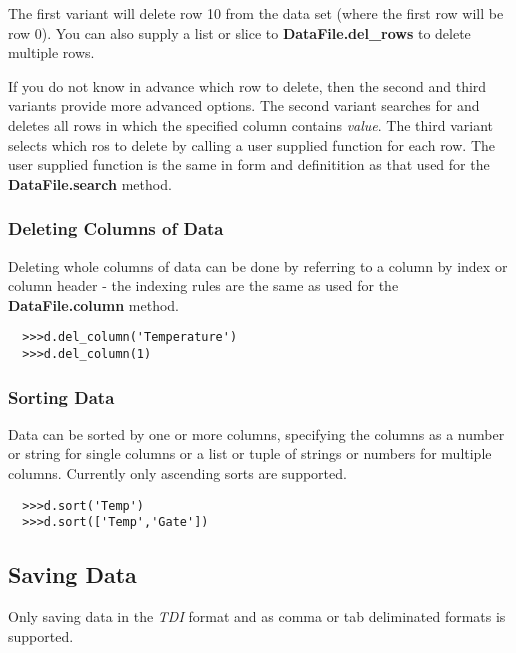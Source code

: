 \documentclass[a4paper,11pt]{scrartcl}
\begin{document}
The first variant will delete row 10 from the data set (where the first row will
be row 0). You can also supply a list or slice to \textbf{DataFile.del\_rows} to
delete multiple rows.

If you do not know in advance which row to delete, then the second and third
variants provide more advanced options. The second variant searches for and
deletes all rows in which the specified column contains \textit{value}. The
third variant selects which ros to delete by calling a user supplied function
for each row. The user supplied function is the same in form and definitition as
that used for the \textbf{DataFile.search} method.

\subsubsection{Deleting Columns of Data}

Deleting whole columns of data can be done by referring to a column by index or
column header - the indexing rules are the same as used for the
\textbf{DataFile.column} method.

\begin{verbatim}
  >>>d.del_column('Temperature')
  >>>d.del_column(1)
\end{verbatim}

\subsubsection{Sorting Data}

Data can be sorted by one or more columns, specifying the columns as a number or
string for single columns or a list or tuple of strings or numbers for multiple
columns. Currently only ascending sorts are supported.

\begin{verbatim}
  >>>d.sort('Temp')
  >>>d.sort(['Temp','Gate'])
\end{verbatim}

\subsection{Saving Data}\label{save}

Only saving data in the \textit{TDI} format and as comma or tab deliminated formats is supported.

\end{document}
